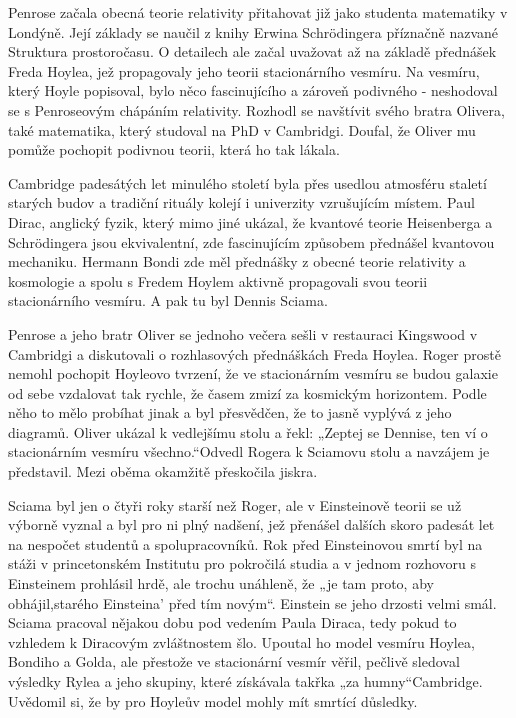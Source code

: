   Penrose začala obecná teorie relativity přitahovat již jako studenta matematiky v Londýně. Její
  základy se naučil z knihy Erwina Schrödingera příznačně nazvané Struktura prostoročasu. O
  detailech ale začal uvažovat až na základě přednášek Freda Hoylea, jež propagovaly jeho teorii
  stacionárního vesmíru. Na vesmíru, který Hoyle popisoval, bylo něco fascinujícího a zároveň
  podivného - neshodoval se s Penroseovým chápáním relativity. Rozhodl se navštívit svého bratra
  Olivera, také matematika, který studoval na PhD v Cambridgi. Doufal, že Oliver mu pomůže pochopit
  podivnou teorii, která ho tak lákala. 

  Cambridge padesátých let minulého století byla přes usedlou atmosféru staletí starých budov a
  tradiční rituály kolejí i univerzity vzrušujícím místem. Paul Dirac, anglický fyzik, který mimo
  jiné ukázal, že kvantové teorie Heisenberga a Schrödingera jsou ekvivalentní, zde fascinujícím
  způsobem přednášel kvantovou mechaniku. Hermann Bondi zde měl přednášky z obecné teorie relativity
  a kosmologie a spolu s Fredem Hoylem aktivně propagovali svou teorii stacionárního vesmíru. A pak
  tu byl Dennis Sciama. 

  Penrose a jeho bratr Oliver se jednoho večera sešli v restauraci Kingswood v Cambridgi a
  diskutovali o rozhlasových přednáškách Freda Hoylea. Roger prostě nemohl pochopit Hoyleovo
  tvrzení, že ve stacionárním vesmíru se budou galaxie od sebe vzdalovat tak rychle, že časem zmizí
  za kosmickým horizontem. Podle něho to mělo probíhat jinak a byl přesvědčen, že to jasně vyplývá z
  jeho diagramů. Oliver ukázal k vedlejšímu stolu a řekl: „Zeptej se Dennise, ten ví o stacionárním
  vesmíru všechno.“Odvedl Rogera k Sciamovu stolu a navzájem je představil. Mezi oběma okamžitě
  přeskočila jiskra. 

  Sciama byl jen o čtyři roky starší než Roger, ale v Einsteinově teorii se už výborně vyznal a byl
  pro ni plný nadšení, jež přenášel dalších skoro padesát let na nespočet studentů a
  spolupracovníků. Rok před Einsteinovou smrtí byl na stáži v princetonském Institutu pro pokročilá
  studia a v jednom rozhovoru s Einsteinem prohlásil hrdě, ale trochu unáhleně, že „je tam proto,
  aby obhájil,starého Einsteina' před tím novým“. Einstein se jeho drzosti velmi smál. Sciama
  pracoval nějakou dobu pod vedením Paula Diraca, tedy pokud to vzhledem k Diracovým zvláštnostem
  šlo. Upoutal ho model vesmíru Hoylea, Bondiho a Golda, ale přestože ve stacionární vesmír věřil,
  pečlivě sledoval výsledky Rylea a jeho skupiny, které získávala takřka „za humny“Cambridge.
  Uvědomil si, že by pro Hoyleův model mohly mít smrtící důsledky. 

